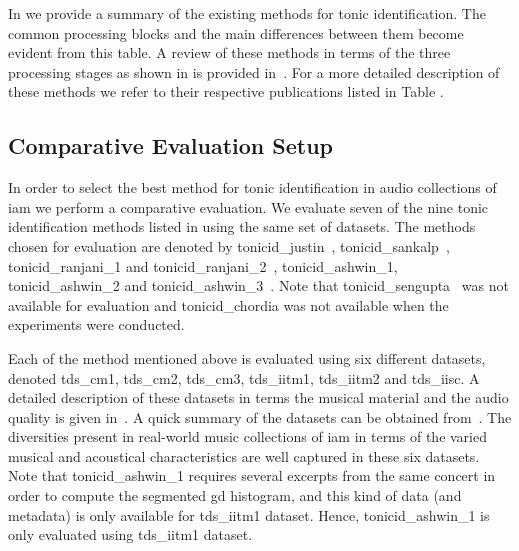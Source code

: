 {In  we provide a summary of the existing methods for tonic identification. The common processing blocks and the main differences between them become evident from this table. A review of these methods in terms of the three processing stages as shown in  is provided in~\cite{Gulati2014Tonic}. For a more detailed description of these methods we refer to their respective publications listed in Table . 


\subsection{Comparative Evaluation Setup}
\label{sec:pre_processing_experimental_setup}

In order to select the best method for tonic identification in audio collections of \gls{iam} we perform a comparative evaluation. We evaluate seven of the nine tonic identification methods listed in  using the same set of datasets. The methods chosen for evaluation are
denoted by \acrshort{tonicid_justin}~\citep{salamon2012multipitch}, \acrshort{tonicid_sankalp}~\citep{gulati2012two}, \acrshort{tonicid_ranjani_1} and \acrshort{tonicid_ranjani_2}~\citep{ranjani2011carnatic}, \acrshort{tonicid_ashwin_1}, \acrshort{tonicid_ashwin_2} and \acrshort{tonicid_ashwin_3}~\citep{bellur2012knowledge}. Note that \acrshort{tonicid_sengupta}~\citep{Sengupta2005b} was not available for
evaluation and \acrshort{tonicid_chordia} was not available when the experiments were conducted. 

Each of the method mentioned above is evaluated using six different datasets, denoted \acrshort{tds_cm1}, \acrshort{tds_cm2}, \acrshort{tds_cm3}, \acrshort{tds_iitm1}, \acrshort{tds_iitm2} and \acrshort{tds_iisc}. A detailed description of these datasets in terms the musical material and the audio quality is given in~. A quick summary of the datasets can be obtained from~. The diversities present in real-world music collections of \gls{iam} in terms of the varied musical and acoustical characteristics are well captured in these six datasets. Note that \acrshort{tonicid_ashwin_1} requires several excerpts from the same concert in order to compute the segmented \gls{gd} histogram, and this kind of data (and metadata) is only available for \acrshort{tds_iitm1} dataset. Hence, \acrshort{tonicid_ashwin_1} is only evaluated using \acrshort{tds_iitm1} dataset.

}

